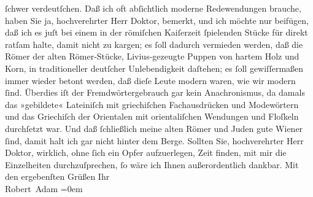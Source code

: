 \begin{ledgroupsized}[t]{13cm}
               ſchwer verdeutſchen. Daß ich oft abſichtlich moderne Redewendungen brauche, haben Sie
               ja, hochverehrter Herr Doktor, be{\pb}merkt,
               und ich möchte nur beifügen, daß ich es juſt bei einem in der römiſchen Kaiſerzeit ſpielenden Stücke für direkt ratſam halte,
               damit nicht zu kargen; es ſoll dadurch vermieden werden, daß die Römer der alten Römer-Stücke, Livius-gezeugte Puppen von
               hartem Holz und Korn, in traditioneller deutſcher Unlebendigkeit daſtehen; es ſoll
               gewiſſermaßen immer wieder betont werden, daß dieſe Leute modern waren, wie wir
               modern ſind. Überdies iſt der Fremdwörtergebrauch gar kein Anachronismus, da damals
               das »gebildete« Lateiniſch mit griechiſchen
               Fachausdrücken und Modewörtern und das Griechiſch der Orientalen mit orientaliſchen Wendungen und Floſkeln
               durchſetzt war. Und daß ſchließlich meine alten Römer und Juden gute Wiener ſind, damit
               halt ich gar nicht hinter dem Berge.\pend
           \pstart
           Sollten Sie, hochverehrter Herr Doktor, wirklich, ohne ſich ein Opfer aufzuerlegen,
               Zeit finden, mit mir die Einzelheiten durchzuſprechen, ſo wäre ich Ihnen
               außerordentlich dankbar.\pend
           \pstart
           Mit den ergebenſten Grüßen\pend
           \pstart
           Ihr{\\[\baselineskip]}\spacefill\mbox{Robert Adam}\pend
           \leftskip=0em{}
         
         \endnumbering{}\end{ledgroupsized}  \newcommand{\dateiname}{L02279}\newcommand{\titel}{Robert Adam an Arthur Schnitzler, 5. 11. 1917}\newcommand{\editorInnen}{Martin Anton Müller und Gerd-Hermann Susen}
      